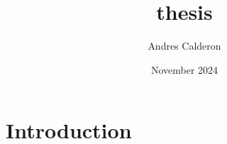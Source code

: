 \documentclass{article}
\title{thesis}
\author{Andres Calderon}
\date{November 2024}
\begin{document}
\maketitle

\section{Introduction}
\end{document}
